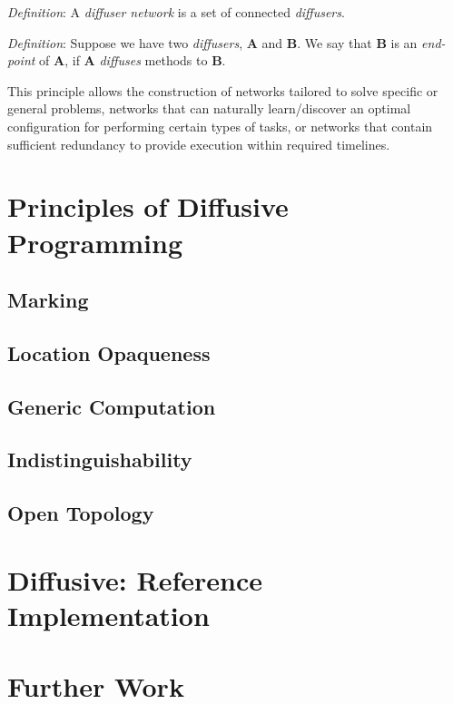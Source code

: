 \documentclass[11pt]{amsart}
\begin{document}
\begin{description}
	\emph{Definition}: A \emph{diffuser network} is a set of connected \emph{diffusers}.
	
	\emph{Definition}: Suppose we have two \emph{diffusers}, \textbf{A} and \textbf{B}. We say that \textbf{B} is an \emph{end-point} of \textbf{A}, if \textbf{A} \emph{diffuses} methods to \textbf{B}.
	
	This principle allows the construction of networks tailored to solve specific or general problems, networks that can naturally learn/discover an optimal configuration for performing certain types of tasks, or networks that contain sufficient redundancy to provide execution within required timelines.

\end{description}

\section{Principles of Diffusive Programming}

\subsection{Marking}

\subsection{Location Opaqueness}

\subsection{Generic Computation}

\subsection{Indistinguishability}

\subsection{Open Topology}

\section{Diffusive: Reference Implementation}

\section{Further Work}
\end{document}
